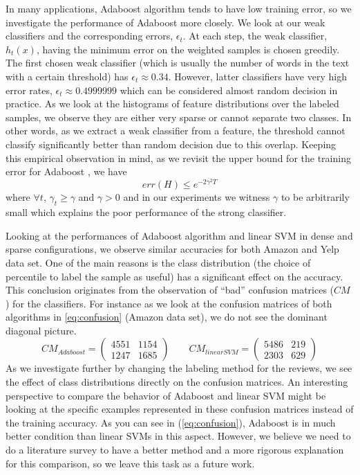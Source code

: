 \documentclass[letterpaper]{article}
\begin{document}
In many applications, Adaboost algorithm tends to have low training
error, so we investigate the performance of Adaboost more closely. We
look at our weak classifiers and the corresponding errors,
$\epsilon_t$. At each step, the weak classifier, $h_t(x)$, having the
minimum error on the weighted samples is chosen greedily. The first
chosen weak classifier (which is usually the number of words in the
text with a certain threshold) has $\epsilon_t \approx 0.34$. However,
latter classifiers have very high error rates, $\epsilon_t \approx
0.4999999$ which can be considered almost random decision in
practice. As we look at the histograms of feature distributions over
the labeled samples, we observe they are either very sparse or
cannot separate two classes. In other words, as we extract a weak
classifier from a feature, the threshold cannot classify significantly
better than random decision due to this overlap. Keeping this
empirical observation in mind, as we revisit the upper bound for the
training error for Adaboost \cite{adaboost}\cite{adaboost2}, we have
\[
err(H) \leq e^{-2\gamma^2 T}
\]
where $\forall t$, $\gamma_t \geq \gamma $ and $\gamma > 0$ and in our
experiments we witness $\gamma$ to be arbitrarily small which explains
the poor performance of the strong classifier.


Looking at the performances of Adaboost algorithm and linear SVM in
dense and sparse configurations, we observe similar accuracies for
both Amazon and Yelp data set. One of the main reasons is the class
distribution (the choice of percentile to label the sample as useful)
has a significant effect on the accuracy. This conclusion originates
from the observation of ``bad'' confusion matrices ($CM$) for the
classifiers. For instance as we look at the confusion matrices of both
algorithms in \ref{eq:confusion} (Amazon data set), we do not see the
dominant diagonal picture.
\begin{equation}
\label{eq:confusion}
CM_{Adaboost} = \left(
\begin{matrix}
4551 & 1154\\
1247 & 1685
\end{matrix}
\right)
\qquad
CM_{linearSVM} = \left(
\begin{matrix}
5486 & 219\\
2303 & 629
\end{matrix}
\right)
\end{equation}
As we investigate further by changing the labeling method
for the reviews, we see the effect of class distributions directly on
the confusion matrices. An interesting perspective to compare the
behavior of Adaboost and linear SVM might be looking at the specific
examples represented in these confusion matrices instead of the training
accuracy. As you can see in (\ref{eq:confusion}), Adaboost is in much
better condition than linear SVMs in this aspect. However, we believe
we need to do a literature survey to have a better method and a more
rigorous explanation
for this comparison, so we leave this task as a future work.
\end{document}
